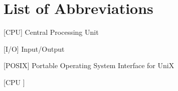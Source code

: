
\chapter*{List of Abbreviations}

\begin{acronym} [CPU ]


 [CPU] {Central Processing Unit}






 [I/O] {Input/Output}







 [POSIX] {Portable Operating System Interface for UniX}











\end{acronym} [CPU ]
